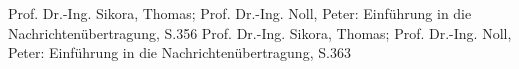 \begin{thebibliography}{999}
       Prof. Dr.-Ing. Sikora, Thomas; Prof. Dr.-Ing. Noll, Peter: Einführung in die
      Nachrichtenübertragung, S.356
       Prof. Dr.-Ing. Sikora, Thomas; Prof. Dr.-Ing. Noll, Peter: Einführung in die
      Nachrichtenübertragung, S.363
%      



\end{thebibliography}


  	    
